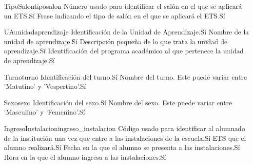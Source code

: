 \begin{cdtEntidad}{TipoSalon}{tiposalon}
	{Número usado para identificar el salón en el que se aplicará un ETS.}{Sí}
	{Frase indicando el tipo de salón en el que se aplicará el ETS.}{Sí}
\end{cdtEntidad}
\begin{cdtEntidad}{UA}{unidadaprendizaje}
	{Identificación de la Unidad de Aprendizaje.}{Sí}
	{Nombre de la unidad de aprendizaje.}{Sí}
	{Descripción pequeña de lo que trata la unidad de aprendizaje.}{Sí}
	{Identificación del programa académico al que pertenece la unidad de aprendizaje.}{Sí}
\end{cdtEntidad}
\begin{cdtEntidad}{Turno}{turno}
	{Identificación del turno.}{Sí}
	{Nombre del turno. Este puede variar entre 'Matutino' y 'Vespertino'.}{Sí}
\end{cdtEntidad}
\begin{cdtEntidad}{Sexo}{sexo}
	{Identificación del sexo.}{Sí}
	{Nombre del sexo. Este puede variar entre 'Masculino' y 'Femenino'.}{Sí}
\end{cdtEntidad}
\begin{cdtEntidad}{IngresoInstalacion}{ingreso\_instalacion}
	{Código usado para identificar al alumnado de la institución una vez que entre a las instalaciones de la escuela.}{Sí}
	{ETS que el alumno realizará.}{Sí}
	{Fecha en la que el alumno se presenta a las instalaciones.}{Sí}
	{Hora en la que el alumno ingresa a las instalaciones.}{Sí}
\end{cdtEntidad}
